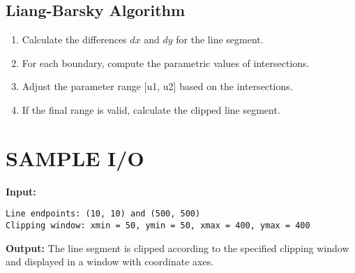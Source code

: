 \documentclass{article}
\begin{document}
\subsection*{Liang-Barsky Algorithm}
\begin{enumerate}
    \item Calculate the differences \(dx\) and \(dy\) for the line segment.
    \item For each boundary, compute the parametric values of intersections.
    \item Adjust the parameter range [u1, u2] based on the intersections.
    \item If the final range is valid, calculate the clipped line segment.
\end{enumerate}


\section*{SAMPLE I/O}
\textbf{Input:}
\begin{verbatim}
Line endpoints: (10, 10) and (500, 500)
Clipping window: xmin = 50, ymin = 50, xmax = 400, ymax = 400
\end{verbatim}

\textbf{Output:}
The line segment is clipped according to the specified clipping window and displayed in a window with coordinate axes.
\end{document}
